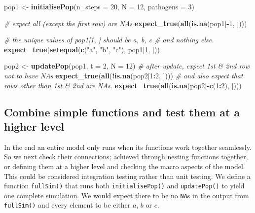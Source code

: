 \documentclass[
]{article}
\newenvironment{Shaded}{\begin{snugshade}}{\end{snugshade}}
\newcommand{\CommentTok}[1]{\textcolor[rgb]{0.56,0.35,0.01}{\textit{#1}}}
\newcommand{\DataTypeTok}[1]{\textcolor[rgb]{0.13,0.29,0.53}{#1}}
\newcommand{\DecValTok}[1]{\textcolor[rgb]{0.00,0.00,0.81}{#1}}
\newcommand{\KeywordTok}[1]{\textcolor[rgb]{0.13,0.29,0.53}{\textbf{#1}}}
\newcommand{\NormalTok}[1]{#1}
\newcommand{\OperatorTok}[1]{\textcolor[rgb]{0.81,0.36,0.00}{\textbf{#1}}}
\newcommand{\StringTok}[1]{\textcolor[rgb]{0.31,0.60,0.02}{#1}}
\begin{document}
\begin{Shaded}
\begin{Highlighting}[]
\NormalTok{pop1 <-}\StringTok{ }\KeywordTok{initialisePop}\NormalTok{(}\DataTypeTok{n_steps =} \DecValTok{20}\NormalTok{, }\DataTypeTok{N =} \DecValTok{12}\NormalTok{, }\DataTypeTok{pathogens =} \DecValTok{3}\NormalTok{) }

\CommentTok{# expect all (except the first row) are NAs}
\KeywordTok{expect_true}\NormalTok{(}\KeywordTok{all}\NormalTok{(}\KeywordTok{is.na}\NormalTok{(pop1[}\OperatorTok{-}\DecValTok{1}\NormalTok{, ]))) }

\CommentTok{# the unique values of pop1[1, ] should be a, b, c}
\CommentTok{#   and nothing else.}
\KeywordTok{expect_true}\NormalTok{(}\KeywordTok{setequal}\NormalTok{(}\KeywordTok{c}\NormalTok{(}\StringTok{"a"}\NormalTok{, }\StringTok{"b"}\NormalTok{, }\StringTok{"c"}\NormalTok{), pop1[}\DecValTok{1}\NormalTok{, ])) }

\NormalTok{pop2 <-}\StringTok{ }\KeywordTok{updatePop}\NormalTok{(pop1, }\DataTypeTok{t =} \DecValTok{2}\NormalTok{, }\DataTypeTok{N =} \DecValTok{12}\NormalTok{)}
\CommentTok{# after update, expect 1st & 2nd row not to have NAs}
\KeywordTok{expect_true}\NormalTok{(}\KeywordTok{all}\NormalTok{(}\OperatorTok{!}\KeywordTok{is.na}\NormalTok{(pop2[}\DecValTok{1}\OperatorTok{:}\DecValTok{2}\NormalTok{, ]))) }
\CommentTok{# and also expect that rows other than 1st & 2nd are NAs.}
\KeywordTok{expect_true}\NormalTok{(}\KeywordTok{all}\NormalTok{(}\KeywordTok{is.na}\NormalTok{(pop2[}\OperatorTok{-}\KeywordTok{c}\NormalTok{(}\DecValTok{1}\OperatorTok{:}\DecValTok{2}\NormalTok{), ]))) }
\end{Highlighting}
\end{Shaded}

\hypertarget{combine}{%
\subsection*{Combine simple functions and test them at a higher level}\label{combine}}

In the end an entire model only runs when its functions work together seamlessly.
So we next check their connections; achieved through nesting functions together, or defining them at a higher level and checking the macro aspects of the model.
This could be considered integration testing rather than unit testing.
We define a function \texttt{fullSim()} that runs both \texttt{initialisePop()} and \texttt{updatePop()} to yield one complete simulation.
We would expect there to be no \texttt{NA}s in the output from \texttt{fullSim()} and every element to be either \(a\), \(b\) or \(c\).
\newline
{}\label{combinesimplefunc}
\end{document}
